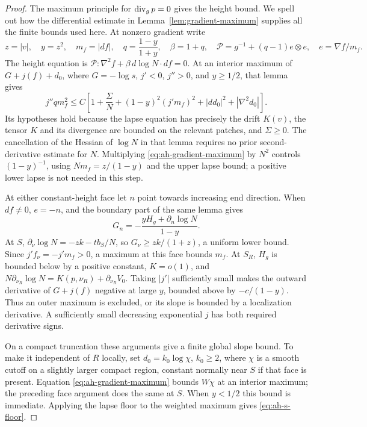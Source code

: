 \begin{proof}
The maximum principle for \(\operatorname{div}_g p=0\) gives the height bound.
We spell out how the differential estimate in
Lemma~\ref{lem:gradient-maximum} supplies all the finite bounds
used here.  At nonzero gradient write
\[
 z=|v|,\quad y=z^2,\quad m_f=|df|,\quad
 q=\frac{1-y}{1+y},\quad
 \beta=1+q,\quad
 \mathcal P=g^{-1}+(q-1)e\otimes e,\quad e=\nabla f/m_f .
\]
The height equation is
\(\mathcal P:\nabla^2 f+\beta\,d\log N\cdot df=0\).
At an interior maximum of
\(G+j(f)+d_0\), where \(G=-\log s\), \(j'<0\),
\(j''>0\), and \(y\ge1/2\), that lemma gives
\begin{equation}\label{eq:ah-gradient-maximum}
 j''q m_f^2\le
 C\left[1+\frac{\Sigma}{N}
 +(1-y)^2(j'm_f)^2+|dd_0|^2+|\nabla^2d_0|\right].
\end{equation}
Its hypotheses hold because the lapse equation has precisely
the drift \(K(v)\), the tensor \(K\) and its divergence are
bounded on the relevant patches, and \(\Sigma\ge0\).
The cancellation of the Hessian of \(\log N\) in that lemma
requires no prior second-derivative estimate for \(N\).
Multiplying \eqref{eq:ah-gradient-maximum} by \(N^2\) controls
\((1-y)^{-1}\), using
\(Nm_f=z/(1-y)\) and the upper lapse bound; a positive lower
lapse is not needed in this step.

At either constant-height face let \(n\) point towards increasing
end direction.  When \(df\ne0\), \(e=-n\), and the boundary part
of the same lemma gives
\[
 G_n=-\frac{yH_g+\partial_n\log N}{1-y}.
\]
At \(S\), \(\partial_\nu\log N=-zk-tb_S/N\), so
\(G_\nu\ge zk/(1+z)\), a uniform lower bound.
Since \(j'f_\nu=-j'm_f>0\), a maximum at this face bounds \(m_f\).
At \(S_R\), \(H_g\) is bounded below by a positive constant,
\(K=o(1)\), and
\(N\partial_{\nu_R}\log N=K(p,\nu_R)+\partial_{\nu_R}V_0\).
Taking \(|j'|\) sufficiently small makes the outward derivative
of \(G+j(f)\) negative at large \(y\), bounded above by
\(-c/(1-y)\).  Thus an outer maximum is excluded, or its slope
is bounded by a localization derivative.  A sufficiently small
decreasing exponential \(j\) has both required derivative signs.

On a compact truncation these arguments give a finite global
slope bound.  To make it independent of \(R\) locally, set
\(d_0=k_0\log\chi\), \(k_0\ge2\), where \(\chi\) is a smooth
cutoff on a slightly larger compact region, constant normally
near \(S\) if that face is present.  Equation
\eqref{eq:ah-gradient-maximum} bounds \(W\chi\) at an interior
maximum; the preceding face argument does the same at \(S\).
When \(y<1/2\) this bound is immediate.  Applying the lapse floor
to the weighted maximum gives \eqref{eq:ah-s-floor}.


\end{proof}
